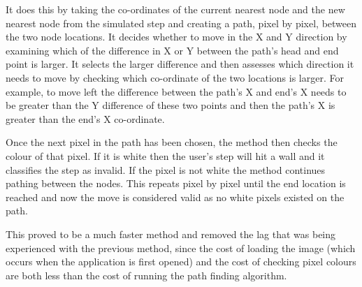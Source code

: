 \documentclass[main.tex]{subfiles}
\begin{document}
It does this by taking the co-ordinates of the current nearest node and the new nearest node from the simulated step and creating a path, pixel by pixel, between the two node locations. It decides whether to move in the X and Y direction by examining which of the difference in X or Y between the path's head and end point is larger. It selects the larger difference and then assesses which direction it needs to move by checking which co-ordinate of the two locations is larger. For example, to move left the difference between the path's X and end's X needs to be greater than the Y difference of these two points and then the path's X is greater than the end's X co-ordinate.

Once the next pixel in the path has been chosen, the method then checks the colour of that pixel. If it is white then the user's step will hit a wall and it classifies the step as invalid. If the pixel is not white the method continues pathing between the nodes. This repeats pixel by pixel until the end location is reached and now the move is considered valid as no white pixels existed on the path.

This proved to be a much faster method and removed the lag that was being experienced with the previous method, since the cost of loading the image (which occurs when the application is first opened) and the cost of checking pixel colours are both less than the cost of running the path finding algorithm.
\end{document}

